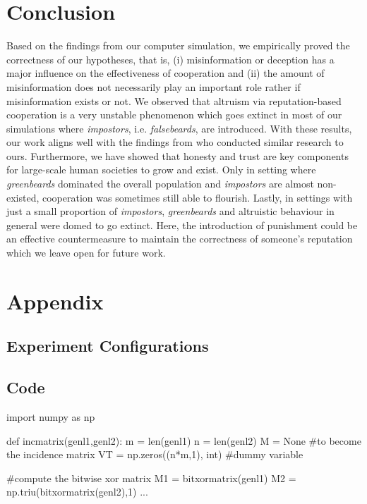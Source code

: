 \documentclass[sigconf]{acmart}
\newcommand{\todo}[1]{{\color{red}{#1}}}
\newcommand{\impostors}{\textit{impostors}\xspace}
\newcommand{\greenbeards}{\textit{greenbeards}\xspace}
\begin{document}
    \section{Conclusion}\label{sec:conclusion}
    Based on the findings from our computer simulation, we empirically proved the correctness of our hypotheses, that is, (i) misinformation or deception has a major influence on the effectiveness of cooperation and (ii) the amount of misinformation does not necessarily play an important role rather if misinformation exists or not.
    We observed that altruism via reputation-based cooperation is a very unstable phenomenon which goes extinct in most of our simulations where \impostors, i.e. \textit{falsebeards}, are introduced.
    With these results, our work aligns well with the findings from \citeauthor{szamado_deception_2016} who conducted similar research to ours.
    Furthermore, we have showed that honesty and trust are key components for large-scale human societies to grow and exist.
    Only in setting where \greenbeards dominated the overall population and \impostors are almost non-existed, cooperation was sometimes still able to flourish.
    Lastly, in settings with just a small proportion of \impostors, \greenbeards and altruistic behaviour in general were domed to go extinct.
    Here, the introduction of punishment could be an effective countermeasure to maintain the correctness of someone's reputation which we leave open for future work.

    
    

    \clearpage

    \onecolumn
    \section*{Appendix}

    \subsection{Experiment Configurations}\label{sec:configs}

    \subsection{Code}\label{sec:code}
    \begin{python}
        import numpy as np

        def incmatrix(genl1,genl2):
        m = len(genl1)
        n = len(genl2)
        M = None #to become the incidence matrix
        VT = np.zeros((n*m,1), int)  #dummy variable

        #compute the bitwise xor matrix
        M1 = bitxormatrix(genl1)
        M2 = np.triu(bitxormatrix(genl2),1)
        ...
    \end{python}
    \todo{add code and config}
    \todo{quick little readme}
\end{document}
